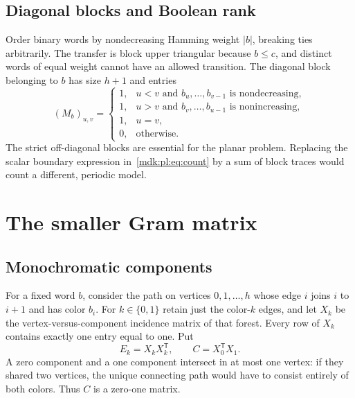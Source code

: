 \documentclass[11pt,letterpaper]{article}
\numberwithin{equation}{section}
\theoremstyle{remark}\newtheorem{remark}[theorem]{Remark}
\begin{document}
\subsection{Diagonal blocks and Boolean rank}
Order binary words by nondecreasing Hamming weight $|b|$, breaking ties arbitrarily. The transfer is block upper triangular because $b\le c$, and distinct words of equal weight cannot have an allowed transition. The diagonal block belonging to $b$ has size $h+1$ and entries
\begin{equation}\label{mdk:pl:eq:M}
 (M_b)_{u,v}=\begin{cases}
 1,&u<v\text{ and }b_u,\ldots,b_{v-1}\text{ is nondecreasing},\\
 1,&u>v\text{ and }b_v,\ldots,b_{u-1}\text{ is nonincreasing},\\
 1,&u=v,\\
 0,&\text{otherwise}.
 \end{cases}
\end{equation}
The strict off-diagonal blocks are essential for the planar problem. Replacing the scalar boundary expression in~\eqref{mdk:pl:eq:count} by a sum of block traces would count a different, periodic model.

\section{The smaller Gram matrix}\label{mdk:pl:sec:gram}
\subsection{Monochromatic components}
For a fixed word $b$, consider the path on vertices $0,1,\ldots,h$ whose edge $i$ joins $i$ to $i+1$ and has color $b_i$. For $k\in\{0,1\}$ retain just the color-$k$ edges, and let $X_k$ be the vertex-versus-component incidence matrix of that forest. Every row of $X_k$ contains exactly one entry equal to one. Put
\begin{equation}\label{mdk:pl:eq:EC}
 E_k=X_kX_k^{\mathsf T},\qquad C=X_0^{\mathsf T}X_1.
\end{equation}
A zero component and a one component intersect in at most one vertex: if they shared two vertices, the unique connecting path would have to consist entirely of both colors. Thus $C$ is a zero-one matrix.
\end{document}
